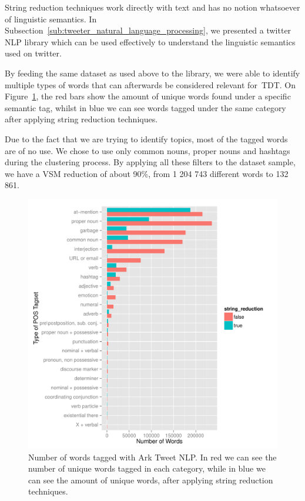 \documentclass[journal]{IEEEtran}
\begin{document}
String reduction techniques work directly with text and has no notion whatsoever of linguistic semantics. In Subsection~\ref{sub:tweeter_natural_language_processing}, we presented a twitter \ac{NLP} library which can be used effectively to understand the linguistic semantics used on twitter. 

By feeding the same dataset as used above to the library, we were able to identify multiple types of words that can afterwards be considered relevant for~\ac{TDT}. On Figure~\ref{fig:wordcount_nlp}, the red bars show the amount of unique words found under a specific semantic tag, whilst in blue we can see words tagged under the same category after applying string reduction techniques.

Due to the fact that we are trying to identify topics, most of the tagged words are of no use. We chose to use only common nouns, proper nouns and hashtags during the clustering process. By applying all these filters to the dataset sample, we have a \ac{VSM} reduction of about 90\%, from 1 204 743 different words to 132 861.

\begin{figure}[h]
  \centering
  \includegraphics[width=1\linewidth]{./plots/svm/plot_wordcount_nlp.pdf}
  \caption{Number of words tagged with Ark Tweet NLP. In red we can see the number of unique words tagged in each category, while in blue we can see the amount of unique words, after applying string reduction techniques.}
  \label{fig:wordcount_nlp}
\end{figure}
\end{document}
